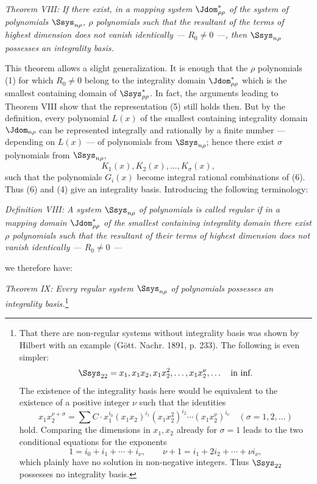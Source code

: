 \documentclass[11pt]{article}
\begin{document}
\emph{Theorem VIII: If there exist, in a mapping system $\Jdom^*_{\rho\rho}$ of the system of polynomials $\Ssys_{n\rho}$, $\rho$ polynomials such that the resultant of the terms of highest dimension does not vanish identically --- $R_0\ne0$ ---, then $\Ssys_{n\rho}$ possesses an integrality basis.}

This theorem allows a slight generalization. It is enough that the $\rho$ polynomials (1) for which $R_0\ne0$ belong to the integrality domain $\Jdom^*_{\rho\rho}$ which is the smallest containing domain of $\Ssys^*_{\rho\rho}$. In fact, the arguments leading to Theorem VIII show that the representation (5) still holds then. But by the definition, every polynomial $L(x)$ of the smallest containing integrality domain $\Jdom_{n\rho}$ can be represented integrally and rationally by a finite number --- depending on $L(x)$ --- of polynomials from $\Ssys_{n\rho}$; hence there exist $\sigma$ polynomials from $\Ssys_{n\rho}$,
\begin{equation}
  K_1(x),K_2(x),\ldots,K_\sigma(x),
\tag{6}
\end{equation}
such that the polynomials $G_i(x)$ become integral rational combinations of (6). Thus (6) and (4) give an integrality basis. Introducing the following terminology:

\emph{Definition VIII: A system $\Ssys_{n\rho}$ of polynomials is called regular if in a mapping domain $\Jdom^*_{\rho\rho}$ of the smallest containing integrality domain there exist $\rho$ polynomials such that the resultant of their terms of highest dimension does not vanish identically --- $R_0\ne0$ ---}

we therefore have:

\emph{Theorem IX: Every regular system $\Ssys_{n\rho}$ of polynomials possesses an integrality basis.}\footnote{That there are non-regular systems without integrality basis was shown by Hilbert with an example (Gött. Nachr. 1891, p. 233). The following is even simpler:
\[
  \Ssys_{22}=x_1,
  x_1x_2,
  x_1x_2^2,
  \ldots,
  x_1x_2^\nu,
  \ldots\quad\text{in inf.}
\]
The existence of the integrality basis here would be equivalent to the existence of a positive integer $\nu$ such that the identities
\[
  x_1x_2^{\nu+\sigma}=\sum C\cdot x_1^{i_0}(x_1x_2)^{i_1}(x_1x_2^2)^{i_2}\cdots(x_1x_2^\nu)^{i_\nu}
  \quad(\sigma=1,2,\ldots)
\]
hold. Comparing the dimensions in $x_1,x_2$ already for $\sigma=1$ leads to the two conditional equations for the exponents
\[
  1=i_0+i_1+\cdots+i_\nu,
  \qquad
  \nu+1=i_1+2i_2+\cdots+\nu i_\nu,
\]
which plainly have no solution in non-negative integers. Thus $\Ssys_{22}$ possesses no integrality basis.}
\end{document}
